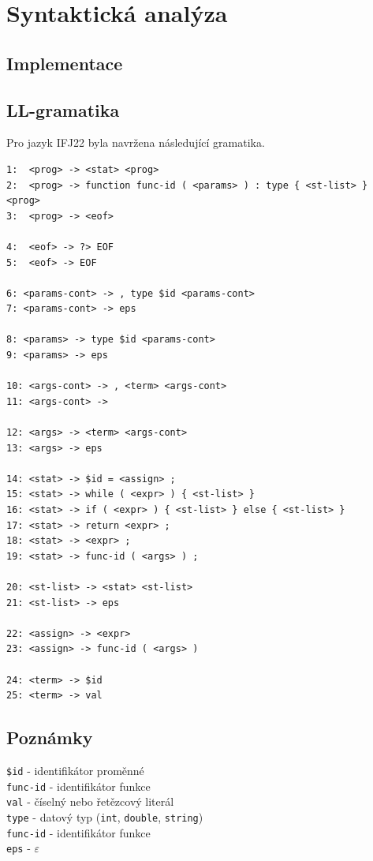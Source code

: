 \documentclass[11pt,a4paper]{article}
\begin{document}
    \pagebreak{}
    
    \section{Syntaktická analýza}
    
    \subsection{Implementace}

    \subsection{LL-gramatika}
    Pro jazyk IFJ22 byla navržena následující gramatika.
    \begin{Verbatim}
1:  <prog> -> <stat> <prog>
2:  <prog> -> function func-id ( <params> ) : type { <st-list> } <prog>
3:  <prog> -> <eof>

4:  <eof> -> ?> EOF
5:  <eof> -> EOF

6: <params-cont> -> , type $id <params-cont>
7: <params-cont> -> eps

8: <params> -> type $id <params-cont>
9: <params> -> eps

10: <args-cont> -> , <term> <args-cont>
11: <args-cont> -> 

12: <args> -> <term> <args-cont>
13: <args> -> eps

14: <stat> -> $id = <assign> ;
15: <stat> -> while ( <expr> ) { <st-list> }
16: <stat> -> if ( <expr> ) { <st-list> } else { <st-list> }
17: <stat> -> return <expr> ;
18: <stat> -> <expr> ;
19: <stat> -> func-id ( <args> ) ;

20: <st-list> -> <stat> <st-list>
21: <st-list> -> eps

22: <assign> -> <expr>
23: <assign> -> func-id ( <args> )

24: <term> -> $id
25: <term> -> val
    \end{Verbatim}
    \subsection*{Poznámky}
        \texttt{\$id} - identifikátor proměnné\\
        \texttt{func-id} - identifikátor funkce\\
        \texttt{val} - číselný nebo řetězcový literál \\
        \texttt{type} - datový typ (\texttt{int}, \texttt{double}, \texttt{string}) \\
        \texttt{func-id} - identifikátor funkce \\
        \texttt{eps} - $\varepsilon$ \\
\end{document}
